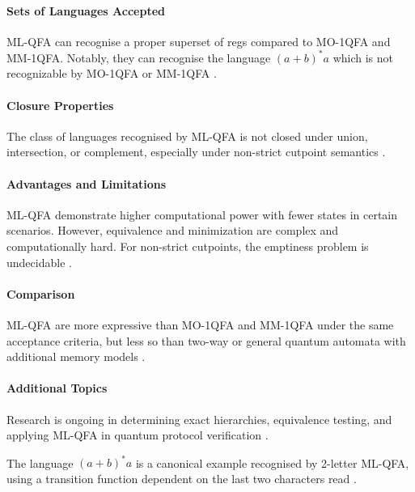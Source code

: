 \paragraph{Sets of Languages Accepted}
ML-QFA can recognise a proper superset of \glspl{reg} compared to MO-1QFA and MM-1QFA. Notably, they can recognise the language $(a + b)^*a$ which is not recognizable by MO-1QFA or MM-1QFA \cite{belovs2007multi}.

\paragraph{Closure Properties}
The class of languages recognised by ML-QFA is not closed under union, intersection, or complement, especially under non-strict cutpoint semantics \cite{qiu2009hierarchy}.

\paragraph{Advantages and Limitations}
ML-QFA demonstrate higher computational power with fewer states in certain scenarios. However, equivalence and minimization are complex and computationally hard. For non-strict cutpoints, the emptiness problem is undecidable \cite{qiu2008decidability}.

\paragraph{Comparison}
ML-QFA are more expressive than MO-1QFA and MM-1QFA under the same acceptance criteria, but less so than two-way or general quantum automata with additional memory models \cite{qiu2011multi}.

\paragraph{Additional Topics}
Research is ongoing in determining exact hierarchies, equivalence testing, and applying ML-QFA in quantum protocol verification \cite{lin2012equivalence, qiu2008decidability}.

\begin{example}
The language $(a + b)^*a$ is a canonical example recognised by 2-letter ML-QFA, using a transition function dependent on the last two characters read \cite{belovs2007multi}.
\end{example}

\subsubsection{}

